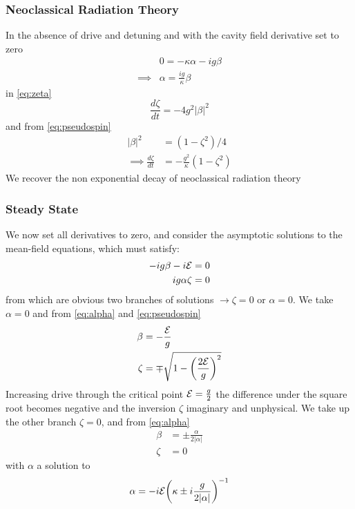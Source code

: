 \subsubsection{Neoclassical Radiation Theory}
In the absence of drive and detuning and with the cavity field derivative set to zero
\begin{align}
  & 0 = -\kappa \alpha - ig \beta \\
  \implies & \alpha = \frac{ig}{\kappa} \beta
\end{align}
in \cref{eq:zeta}
\begin{equation}
  \frac{d \zeta}{dt} = -4 g^2 |\beta|^2
\end{equation}
and from \cref{eq:pseudospin}
\begin{align}
   |\beta|^2 &= (1-\zeta^2)/4 \\
\implies \frac{d \zeta}{dt} &= -\frac{g^2}{\kappa} (1-\zeta^2)
\end{align}
We recover the non exponential decay of neoclassical radiation theory

\subsubsection{Steady State}
We now set all derivatives to zero, and consider the asymptotic solutions to the mean-field equations, which must satisfy:
\begin{align}
  -ig \beta -i \mathcal{E} &= 0 \\
  ig\alpha \zeta &= 0
\end{align}
from which are obvious two branches of solutions $\rightarrow \zeta = 0$ or $\alpha = 0$. We take $\alpha = 0$ and from \cref{eq:alpha} and \cref{eq:pseudospin}
\begin{align}
  \beta &= -\frac{\mathcal{E}}{g} \\
  \zeta &= \mp \sqrt{1 - {\left( \frac{2\mathcal{E}}{g} \right)}^2}
\end{align}
Increasing drive through the critical point $\mathcal{E} = \frac{g}{2}$ the difference under the square root becomes negative and the inversion $\zeta$ imaginary and unphysical. We take up the other branch $\zeta = 0$, and from \cref{eq:alpha}
\begin{align}
  \beta &= \pm \frac{\alpha}{2|\alpha|} \\
  \zeta &= 0
\end{align}
with $\alpha$ a solution to
\begin{equation}
  \alpha = -i \mathcal{E}{\left ( \kappa \pm i \frac{g}{2|\alpha|} \right )}^{-1}
  \label{eq:alphacondnotdet}
\end{equation}


